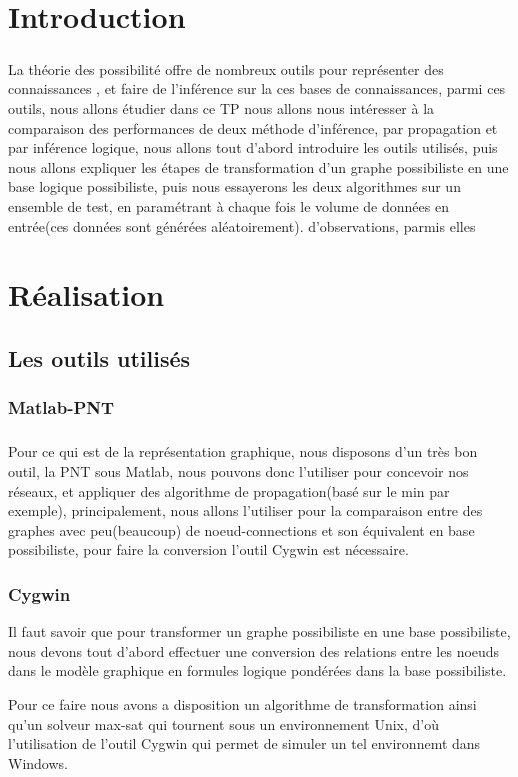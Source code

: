 \documentclass[]{report}
\begin{document}
	 
	
	\tableofcontents

	\listoffigures

	
	\chapter{Introduction }
	\paragraph{}
	La théorie des possibilité offre de nombreux outils pour représenter des connaissances , et faire de l'inférence sur la ces bases de connaissances, parmi ces outils, nous allons étudier dans ce TP nous allons nous intéresser à la comparaison des performances de deux
	méthode d'inférence, par propagation et par inférence logique, nous allons tout d'abord introduire les outils utilisés, puis nous allons expliquer les étapes de transformation d'un graphe possibiliste en une base logique possibiliste, puis nous essayerons les deux algorithmes sur un ensemble de test, en paramétrant à chaque fois le volume de données en entrée(ces données sont générées aléatoirement).
	d'observations, parmis elles 
	\chapter{Réalisation}
	\section{Les outils utilisés}
	\subsection{Matlab-PNT}
	\paragraph{}
	Pour ce qui est de la représentation graphique, nous disposons d'un très bon outil, la PNT sous Matlab, nous pouvons donc l'utiliser pour concevoir nos réseaux, et appliquer des algorithme de propagation(basé sur le min par exemple), principalement, nous allons l'utiliser pour la comparaison entre des graphes avec peu(beaucoup) de noeud-connections
	et son équivalent en base possibiliste, pour faire la conversion l'outil Cygwin est nécessaire.
	\subsection{Cygwin}
	 Il faut savoir que pour transformer un graphe possibiliste en une base possibiliste, nous devons tout d'abord effectuer une conversion des relations entre les noeuds dans le modèle graphique en formules logique pondérées dans la base possibiliste.
	 \par 
	 Pour ce faire nous avons a disposition un algorithme de transformation ainsi qu'un solveur max-sat qui tournent sous un environnement Unix, d'où l'utilisation de l'outil Cygwin qui permet de simuler un tel environnemt dans Windows.
	 
\end{document}
